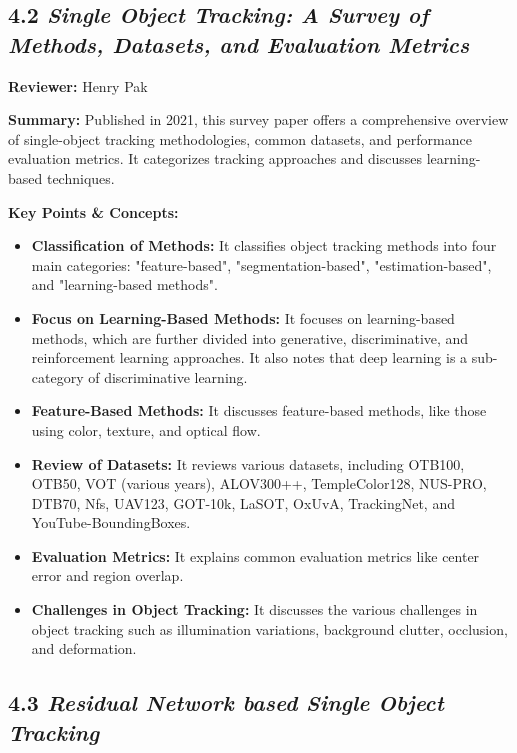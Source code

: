 \documentclass{article}
\begin{document}
\subsection*{4.2 \textit{Single Object Tracking: A Survey of Methods, Datasets, and Evaluation Metrics}}

\hspace*{\parindent}\textbf{Reviewer:} Henry Pak

\vspace{0.3cm}

\textbf{Summary:} Published in 2021, this survey paper offers a comprehensive overview of single-object tracking methodologies, common datasets, and performance evaluation metrics. It categorizes tracking approaches and discusses learning-based techniques.

\vspace{0.3cm}

\textbf{Key Points \& Concepts:}
\begin{itemize}
  \item \textbf{Classification of Methods:} It classifies object tracking methods into four main categories: "feature-based", "segmentation-based", "estimation-based", and "learning-based methods".
  \item \textbf{Focus on Learning-Based Methods:} It focuses on learning-based methods, which are further divided into generative, discriminative, and reinforcement learning approaches. It also notes that deep learning is a sub-category of discriminative learning.
  \item \textbf{Feature-Based Methods:} It discusses feature-based methods, like those using color, texture, and optical flow.
  \item \textbf{Review of Datasets:} It reviews various datasets, including OTB100, OTB50, VOT (various years), ALOV300++, TempleColor128, NUS-PRO, DTB70, Nfs, UAV123, GOT-10k, LaSOT, OxUvA, TrackingNet, and YouTube-BoundingBoxes.
  \item \textbf{Evaluation Metrics:} It explains common evaluation metrics like center error and region overlap.
  \item \textbf{Challenges in Object Tracking:} It discusses the various challenges in object tracking such as illumination variations, background clutter, occlusion, and deformation.
\end{itemize}
\subsection*{4.3 \textit{Residual Network based Single Object Tracking}}
\end{document}
